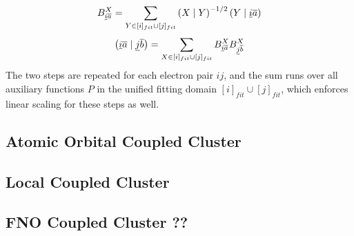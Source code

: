 \begin{equation}
B^{X}_{\underline{i}\overline{a}} = \sum_{Y \in [i]_{fit} \cup [j]_{fit}} \left( X \mid Y \right)^{-1/2} \left( Y \mid \underline{i}\overline{a} \right)
\end{equation}
\begin{equation}
\left( \underline{i}\overline{a} \mid \underline{j}\overline{b} \right) = \sum_{X \in [i]_{fit} \cup [j]_{fit}} B^{X}_{\underline{i}\overline{a}} B^{X}_{\underline{j}\overline{b}} 
\end{equation}
\noindent The two steps are repeated for each electron pair $ij$, and the sum runs over all auxiliary functions $P$ in the unified fitting domain $[i]_{fit} \cup [j]_{fit}$, which enforces linear scaling for these steps as well. 


\subsection{Atomic Orbital Coupled Cluster}

\subsection{Local Coupled Cluster}

\subsection{FNO Coupled Cluster ??}




